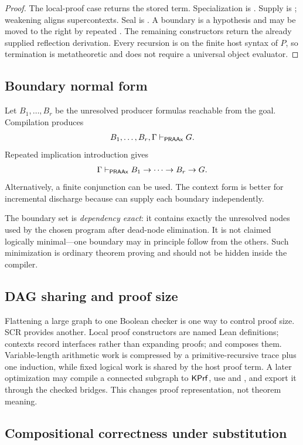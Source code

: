 \begin{proof}
The local-proof case returns the stored term.  Specialization is
.  Supply is ; weakening aligns supercontexts.
Seal is .  A boundary is a hypothesis and may be moved to the
right by repeated .  The remaining constructors return the
already supplied reflection derivation.  Every recursion is on the finite host
syntax of \(P\), so termination is metatheoretic and does not require a
universal object evaluator.
\end{proof}

\subsection{Boundary normal form}

Let \(B_1,\ldots,B_r\) be the unresolved producer formulas reachable from the
goal.  Compilation produces
\[
       B_1,\ldots,B_r,\Gamma\mathrel{\vdash_{\mathsf{PRAAx}}} G.
\]
Repeated implication introduction gives
\[
       \Gamma\mathrel{\vdash_{\mathsf{PRAAx}}} B_1\to\cdots\to B_r\to G.
\]
Alternatively, a finite conjunction can be used.  The context form is better
for incremental discharge because  can supply each boundary
independently.

The boundary set is \emph{dependency exact}: it contains exactly the unresolved
nodes used by the chosen program after dead-node elimination.  It is not
claimed logically minimal---one boundary may in principle follow from the
others.  Such minimization is ordinary theorem proving and should not be hidden
inside the compiler.

\subsection{DAG sharing and proof size}

Flattening a large graph to one Boolean checker is one way to control proof
size.  SCR provides another.  Local proof constructors are named Lean
definitions; contexts record interfaces rather than expanding proofs; and
 composes them.  Variable-length arithmetic work is compressed
by a primitive-recursive trace plus one induction, while fixed logical work is
shared by the host proof term.  A later optimization may compile a connected
subgraph to \(\mathsf{KPrf}\), use  and , and export it
through the checked bridges.  This changes proof representation, not theorem
meaning.

\subsection{Compositional correctness under substitution}

